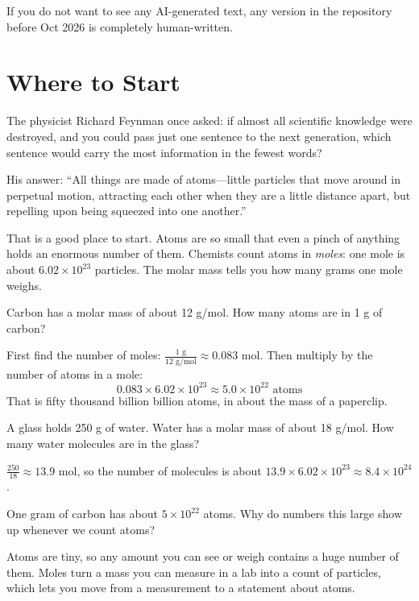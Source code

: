 If you do not want to see any AI-generated text, any version in the repository before Oct 2026 is completely human-written.

\section{Where to Start}
The physicist Richard Feynman once asked: if
almost all scientific knowledge were destroyed, and you could pass just
one sentence to the next generation, which sentence would carry the most
information in the fewest words?

His answer: ``All things are made of atoms---little particles
that move around in perpetual motion, attracting each other when they are a
little distance apart, but repelling upon being squeezed into one another.''

That is a good place to start. Atoms are so small that even a pinch of
anything holds an enormous number of them. Chemists count atoms in
\emph{moles}: one mole is about $6.02 \times 10^{23}$ particles. The molar
mass tells you how many grams one mole weighs.

\begin{Worked}
\begin{Problem}
Carbon has a
molar mass of about 12 g/mol. How many atoms are in 1 g of carbon?
\end{Problem}
\begin{Solution}
First find the number of moles: $\frac{1 \text{ g}}{12 \text{ g/mol}} \approx 0.083$ mol.
Then multiply by the number of atoms in a mole:
$$0.083 \times 6.02 \times 10^{23} \approx 5.0 \times 10^{22} \text{ atoms}$$
That is fifty thousand billion billion atoms, in about the mass of a
paperclip.
\end{Solution}
\end{Worked}

\begin{Exercise}[label=intro1, title=Counting molecules in a glass of water]
A glass holds 250 g of water. Water has a molar mass of about 18 g/mol.
How many water molecules are in the glass?
\end{Exercise}
\begin{Answer}[ref=intro1]
$\frac{250}{18} \approx 13.9$ mol, so the number of molecules is about
$13.9 \times 6.02 \times 10^{23} \approx 8.4 \times 10^{24}$.
\end{Answer}

\begin{Exercise}[label=intro2, title=Why such big numbers?]
One gram of carbon has about $5 \times 10^{22}$ atoms. Why do numbers this
large show up whenever we count atoms?
\end{Exercise}
\begin{Answer}[ref=intro2]
Atoms are tiny, so any amount you can see or weigh contains a huge number
of them. Moles turn a mass you can measure in a lab into a count of
particles, which lets you move from a measurement to a statement about
atoms.
\end{Answer}
